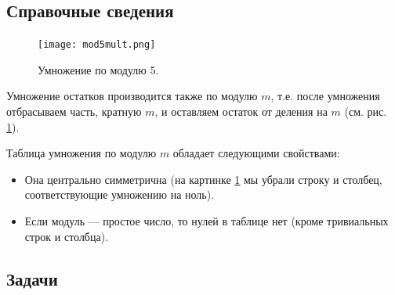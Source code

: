 \subsection*{Справочные сведения}

\begin{figure}
\texttt{[image: mod5mult.png]}
\caption{Умножение по модулю 5.}\label{mod5mult}
\end{figure}
Умножение остатков производится также по модулю $m$, т.е. после умножения отбрасываем часть, кратную $m$, и оставляем остаток от деления на $m$ (см. рис. \ref{mod5mult}).

Таблица умножения по модулю $m$ обладает следующими свойствами:
\begin{itemize}
\item Она центрально симметрична (на картинке \ref{mod5mult} мы убрали строку и столбец, соответствующие умножению на ноль).
\item Если модуль --- простое число, то нулей в таблице нет (кроме тривиальных строк и столбца).
\end{itemize}


\subsection*{Задачи}

